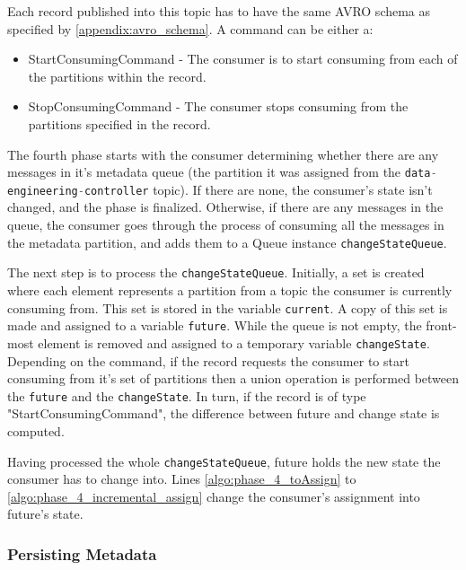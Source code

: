 Each record published into this topic has to have the same AVRO schema as
specified by \ref{appendix:avro_schema}. A command can be either a:
\begin{itemize} \item StartConsumingCommand - The consumer is to start consuming
            from each of the partitions within the record.  \item
StopConsumingCommand - The consumer stops consuming from the partitions
specified in the record.  \end{itemize}

The fourth phase starts with the consumer determining whether there are any
messages in it's metadata queue (the partition it was assigned from the
\lstinline[language=Python]{data-engineering-controller} topic). If there are
none, the consumer's state isn't changed, and the phase is finalized. Otherwise,
if there are any messages in the queue, the consumer goes through the process of
consuming all the messages in the metadata partition, and adds them to a Queue
instance \lstinline[language=Python]{changeStateQueue}.

The next step is to process the \lstinline[language=Python]{changeStateQueue}.
Initially, a set is created where each element represents a partition from a
topic the consumer is currently consuming from. This set is stored in the
variable \lstinline[language=Python]{current}. A copy of this set is made and
assigned to a variable \lstinline[language=Python]{future}. While the queue is
not empty, the front-most element is removed and assigned to a temporary
variable \lstinline[language=Python]{changeState}. Depending on the command, if
the record requests the consumer to start consuming from it's set of partitions
then a union operation is performed between the
\lstinline[language=Python]{future} and the
\lstinline[language=Python]{changeState}. In turn, if the record is of type
"StartConsumingCommand", the difference between future and change state is
computed.

Having processed the whole \lstinline[language=Python]{changeStateQueue}, future
holds the new state the consumer has to change into. Lines
\ref{algo:phase_4_toAssign} to \ref{algo:phase_4_incremental_assign} change the
consumer's assignment into future's state.

\subsubsection{Persisting Metadata}

